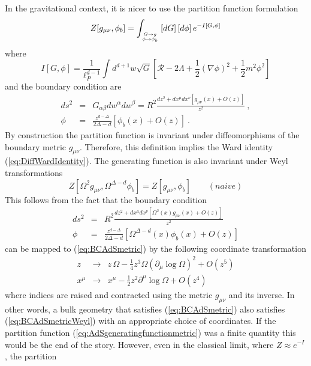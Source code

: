 \documentclass{ws-rv9x6}
\newcommand\be{\begin{equation}}
\newcommand\ee{\end{equation}}
\begin{document}
In the gravitational context, it is nicer to use the partition function
formulation
\begin{equation}
Z[g_{\mu\nu},\phi_{b}]=\int_{{G\to g\atop \phi\to\phi_{b}}}\left[dG\right]\left[d\phi\right]e^{-I[G,\phi]}\label{eq:AdSgeneratingfunctionmetric}
\end{equation}
where 
\be
I[G,\phi]=\frac{1}{\ell_{P}^{d-1}}\int d^{d+1}w\sqrt{G}\left[\mathcal{R}-2\Lambda+\frac{1}{2}\left(\nabla\phi\right)^{2}+\frac{1}{2}m^{2}\phi^{2}\right]
\ee
and the boundary condition are 
\begin{eqnarray}
ds^{2} & = & G_{\alpha\beta}dw^{\alpha}dw^{\beta}=R^{2}\frac{dz^{2}+dx^{\mu}dx^{\nu}\left[g_{\mu\nu}(x)+O(z)\right]}{z^{2}}\ ,\label{eq:BCAdSmetric}\\
\phi & = & \frac{z^{d-\Delta}}{2\Delta-d}\left[\phi_{b}(x)+O(z)\right]\ .\nonumber 
\end{eqnarray}
By construction the partition function is invariant under diffeomorphisms
of the boundary metric $g_{\mu\nu}$. Therefore, this definition implies
the Ward identity (\ref{eq:DiffWardIdentity}). The generating function
is also invariant under Weyl transformations
\be
Z\left[\Omega^{2}g_{\mu\nu},\Omega^{\Delta-d}\phi_{b}\right]=Z\left[g_{\mu\nu},\phi_{b}\right]\qquad(naive)
\ee
This follows from the fact that the boundary condition
\begin{eqnarray}
ds^{2} & = & R^{2}\frac{dz^{2}+dx^{\mu}dx^{\nu}\left[\Omega^{2}(x)g_{\mu\nu}(x)+O(z)\right]}{z^{2}}\label{eq:BCAdSmetricWeyl}\\
\phi & = & \frac{z^{d-\Delta}}{2\Delta-d}\left[\Omega^{\Delta-d}(x)\phi_{b}(x)+O(z)\right]\nonumber 
\end{eqnarray}
can be mapped to (\ref{eq:BCAdSmetric}) by the following coordinate
transformation
\begin{eqnarray}
z & \to & z\,\Omega-\frac{1}{4}z^{3}\Omega\left(\partial_{\mu}\log\Omega\right)^{2}+O(z^{5})\label{eq:coordtransWeylAds}\\
x^{\mu} & \to & x^{\mu}-\frac{1}{2}z^{2}\partial^{\mu}\log\Omega+O(z^{4})\nonumber 
\end{eqnarray}
where indices are raised and contracted using the metric $g_{\mu\nu}$
and its inverse. In other words, a bulk geometry that satisfies (\ref{eq:BCAdSmetric})
also satisfies (\ref{eq:BCAdSmetricWeyl}) with an appropriate choice
of coordinates. If the partition function (\ref{eq:AdSgeneratingfunctionmetric})
was a finite quantity this would be the end of the story. However,
even in the classical limit, where $Z\approx e^{-I}$, the partition
\end{document}
